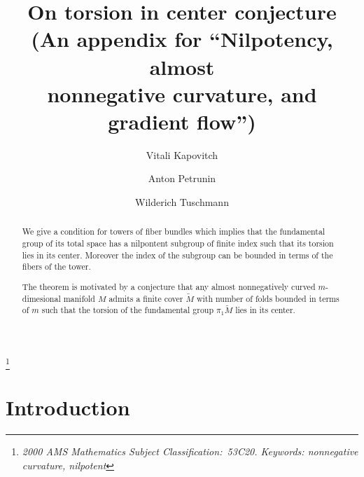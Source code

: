 \documentclass{amsart}
\begin{document}
\title[On torsion in center conjecture]{On torsion in center conjecture\\
(An appendix for ``Nilpotency, almost\\
nonnegative curvature, and gradient flow'')}
\thanks{\it 2000 AMS Mathematics Subject Classification:\rm\
53C20. Keywords: nonnegative curvature, nilpotent}\rm
\author{Vitali Kapovitch}
\address{Vitali Kapovitch\\Department of Mathematics\\University of Toronto\\
Toronto, Ontario, M5S 2E4, Canada.}\email{vtk@math.toronto.edu}
\author{Anton Petrunin }\address{Anton Petrunin\\ Department of Mathematics\\ Pennsylvania State University\\
University Park, State College, PA 16802, USA.
}
\author{Wilderich Tuschmann}\address{Wilderich Tuschmann
\\Arbeitsgruppe Differentialgeometrie
\\Institut f\"ur Algebra und Geometrie
\\Fakult\"at f\"ur Mathematik
\\Karlsruher Institut f\"ur Technologie
\\Englerstr. 2
\\D-76131 Karlsruhe, Deutschland.}

\maketitle
\begin{abstract}
We give a condition for towers of fiber bundles which implies that the fundamental group of its total space has a nilpontent subgroup of finite index such that its torsion lies in its center.
Moreover the index of the subgroup can be bounded in terms of the fibers of the tower.

The theorem is motivated by a conjecture that
any almost nonnegatively curved $m$-dimesional manifold $M$ 
admits a finite cover $\tilde M$ with number of folds bounded in terms of $m$
such that the torsion of the fundamental group $\pi_1 \tilde M$ lies in its center.
\end{abstract}


\section{Introduction}
\end{document}
